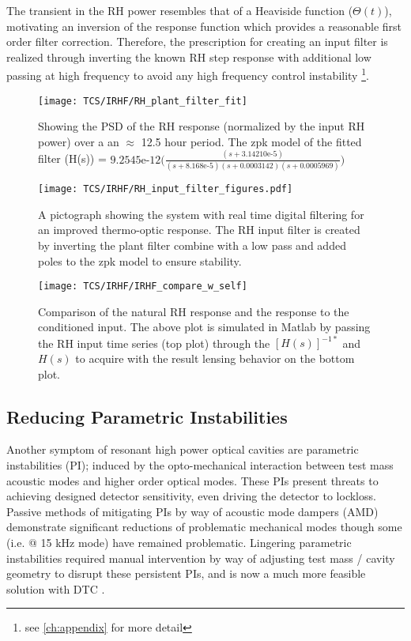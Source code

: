 The transient in the RH power resembles that of a Heaviside function ($\Theta(t)$), motivating an inversion of the response function which provides a reasonable first order filter correction. Therefore, the prescription for creating an input filter is realized through inverting the known RH step response with additional low passing at high frequency to avoid any high frequency control instability \footnote{see \autoref{ch:appendix} for more detail}.

\begin{figure}[H]
    \centering
    \texttt{[image: TCS/IRHF/RH\_plant\_filter\_fit]}
    \caption{Showing the PSD of the RH response (normalized by the input RH power) over a an $\approx$ 12.5 hour period. The zpk model of the fitted filter (H(s)) = $9.2545\mathrm{e} \text{-}12 \Big(\frac{(s+3.14210\mathrm{e}\text{-}5)}{(s+8.168\mathrm{e}\text{-}5)(s+0.0003142)(s+0.0005969)}\Big)$}
    \label{fig:plant_v_fit}
\end{figure}

\begin{figure}[H]
    \centering
    \texttt{[image: TCS/IRHF/RH\_input\_filter\_figures.pdf]}
    \caption{A pictograph showing the system with real time digital filtering for an improved thermo-optic response. The RH input filter is created by inverting the plant filter combine with a low pass and added poles to the zpk model to ensure stability.}
    \label{fig:rtdf_pictograph}
\end{figure}

\begin{figure}[H]
    \centering
    \texttt{[image: TCS/IRHF/IRHF\_compare\_w\_self]}
    \caption{Comparison of the natural RH response and the response to the conditioned input. The above plot is simulated in Matlab by passing the RH input time series (top plot) through the $[H(s)]^{-1*}$ and $H(s)$ to acquire with the result lensing behavior on the bottom plot.}
    \label{fig:dynam_comparison}
\end{figure}

\subsection{Reducing Parametric Instabilities}
Another symptom of resonant high power optical cavities are parametric instabilities (PI); induced by the opto-mechanical interaction between test mass acoustic modes and higher order optical modes. These PIs present threats to achieving designed detector sensitivity, even driving the detector to lockloss. Passive methods of mitigating PIs by way of acoustic mode dampers (AMD) demonstrate significant reductions of problematic mechanical modes though some (i.e. @ 15 kHz mode) have remained problematic. Lingering parametric instabilities required manual intervention by way of adjusting test mass / cavity geometry to disrupt these persistent PIs, and is now a much more feasible solution with DTC \cite{hardwick:2020}.  

